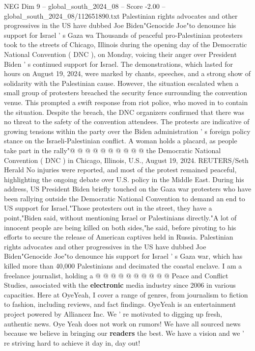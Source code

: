 \begin{textsample}{NEG Dim 9 – global\_south\_2024\_08 – Score -2.00 – global\_south\_2024\_08/112651890.txt}  \label{ex:f9_neg_338}
Palestinian rights advocates and other progressives in the US have dubbed Joe Biden"Genocide Joe"to denounce his support for Israel ' s Gaza wa Thousands of peaceful pro-Palestinian protesters took to the streets of Chicago, Illinois during the opening day of the Democratic National Convention ( DNC ), on Monday, voicing their anger over President Biden ' s continued support for Israel.
The demonstrations, which lasted for hours on August 19, 2024, were marked by chants, speeches, and a strong show of solidarity with the Palestinian cause.
However, the situation escalated when a small group of protesters breached the security fence surrounding the convention venue.
This prompted a swift response from riot police, who moved in to contain the situation.
Despite the breach, the DNC organizers confirmed that there was no threat to the safety of the convention attendees.
The protests are indicative of growing tensions within the party over the Biden administration ' s foreign policy stance on the Israeli-Palestinian conflict.
A woman holds a placard, as people take part in the rally"@ @ @ @ @ @ @ @ @ @ the Democratic National Convention ( DNC ) in Chicago, Illinois, U.S., August 19, 2024.
REUTERS/Seth Herald No injuries were reported, and most of the protest remained peaceful, highlighting the ongoing debate over U.S. policy in the Middle East.
During his address, US President Biden briefly touched on the Gaza war protesters who have been rallying outside the Democratic National Convention to demand an end to US support for Israel."Those protesters out in the street, they have a point,"Biden said, without mentioning Israel or Palestinians directly."A lot of innocent people are being killed on both sides,"he said, before pivoting to his efforts to secure the release of American captives held in Russia.
Palestinian rights advocates and other progressives in the US have dubbed Joe Biden"Genocide Joe"to denounce his support for Israel ' s Gaza war, which has killed more than 40,000 Palestinians and decimated the coastal enclave.
I am a freelance journalist, holding a @ @ @ @ @ @ @ @ @ @ Peace and Conflict Studies, associated with the \textbf{electronic} media industry since 2006 in various capacities.
Here at OyeYeah, I cover a range of genres, from journalism to fiction to fashion, including reviews, and fact findings.
OyeYeah is an entertainment project powered by Alliancez Inc.
We ' re motivated to digging up fresh, authentic news.
Oye Yeah does not work on rumors!
We have all sourced news because we believe in bringing our \textbf{readers} the best.
We have a vision and we ' re striving hard to achieve it day in, day out!

\end{textsample}
